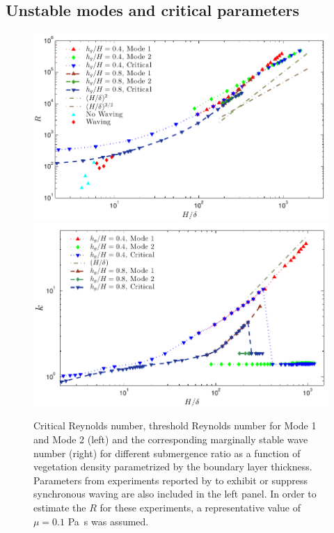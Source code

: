 \documentclass[12pt]{report}   %
\newcommand{\Rey}{{R}}
\begin{document}
\subsection{Unstable modes and critical parameters}
\begin{figure}
\begin{center}
\includegraphics[scale = 0.95]{new_graph_R_vs_delta}\\
\includegraphics[scale = 0.95]{new_graph_K_vs_delta}
\end{center}
\caption[ Critical Reynolds number, threshold Reynolds number for Mode 1 and Mode 2 and the corresponding marginally stable wave number for different submergence ratio]{
Critical Reynolds number, threshold Reynolds number for Mode 1 and Mode 2 (left) and the corresponding marginally stable wave number (right) for different submergence ratio as a function of vegetation density parametrized by the boundary layer thickness. 
Parameters from experiments reported by \cite{Ghisal02} to exhibit or suppress synchronous waving are also included in the left panel. 
In order to estimate the $\Rey$ for these experiments, a representative value of $\mu=0.1$ Pa~s was assumed.
}
\label{Re_vs_delta}
\end{figure}
\end{document}
